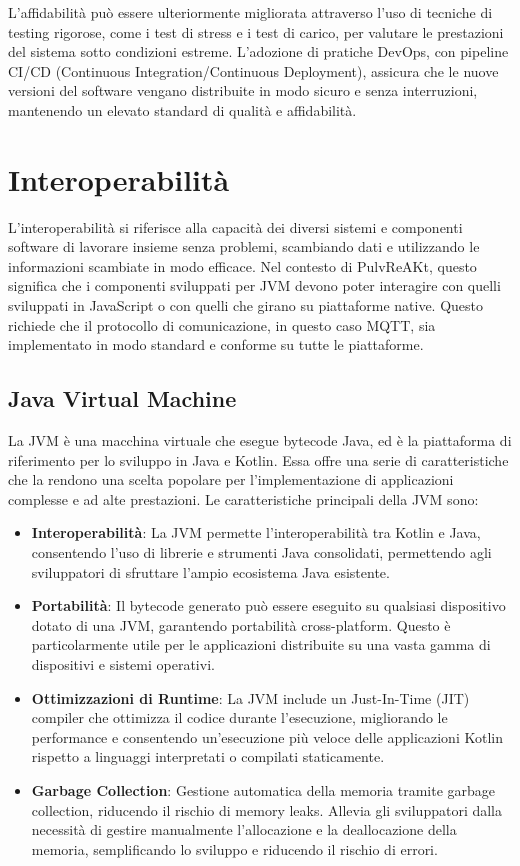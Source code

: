 \documentclass[12pt,a4paper,openright,twoside]{book}
\begin{document}
L'affidabilità può essere ulteriormente migliorata attraverso l'uso di tecniche di testing rigorose, come i test di stress e i test di carico, per valutare le prestazioni del 
sistema sotto condizioni estreme. L'adozione di pratiche DevOps, con pipeline CI/CD (Continuous Integration/Continuous Deployment), assicura che le nuove versioni del software 
vengano distribuite in modo sicuro e senza interruzioni, mantenendo un elevato standard di qualità e affidabilità.

\section{Interoperabilità}

L'interoperabilità si riferisce alla capacità dei diversi sistemi e componenti software di lavorare insieme senza problemi, scambiando dati e utilizzando le informazioni scambiate 
in modo efficace. Nel contesto di PulvReAKt, questo significa che i componenti sviluppati per \ac{JVM} devono poter interagire con quelli sviluppati in JavaScript o con quelli 
che girano su piattaforme native. Questo richiede che il protocollo di comunicazione, in questo caso \ac{MQTT}, sia implementato in modo standard e conforme su tutte le piattaforme.

\subsection{Java Virtual Machine}

La \ac{JVM} è una macchina virtuale che esegue bytecode Java, ed è la piattaforma di riferimento per lo sviluppo in Java e Kotlin. 
Essa offre una serie di caratteristiche che la rendono una scelta popolare per l'implementazione di applicazioni complesse e ad alte prestazioni.
Le caratteristiche principali della \ac{JVM} sono:

\begin{itemize}
\item \textbf{Interoperabilità}: La \ac{JVM} permette l'interoperabilità tra Kotlin e Java, consentendo l'uso di librerie e strumenti Java consolidati, 
 permettendo agli sviluppatori di sfruttare l'ampio ecosistema Java esistente.
\item \textbf{Portabilità}: Il bytecode generato può essere eseguito su qualsiasi dispositivo dotato di una \ac{JVM}, garantendo portabilità cross-platform. 
Questo è particolarmente utile per le applicazioni distribuite su una vasta gamma di dispositivi e sistemi operativi.
\item \textbf{Ottimizzazioni di Runtime}: La \ac{JVM} include un Just-In-Time (JIT) compiler che ottimizza il codice durante l'esecuzione, migliorando le performance e 
consentendo un'esecuzione più veloce delle applicazioni Kotlin rispetto a linguaggi interpretati o compilati staticamente.
\item \textbf{Garbage Collection}: Gestione automatica della memoria tramite garbage collection, riducendo il rischio di memory leaks. 
Allevia gli sviluppatori dalla necessità di gestire manualmente l'allocazione e la deallocazione della memoria, semplificando lo sviluppo e riducendo il rischio di errori.
\end{itemize}
\end{document}
